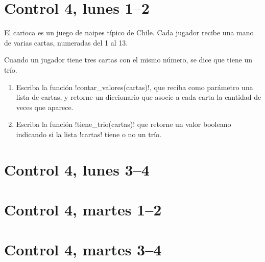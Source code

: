 \documentclass[12pt,spanish,a5paper,landscape]{article}
\begin{document}
  \pagestyle{empty}
  \thispagestyle{empty}

  \part*{Control 4, lunes 1--2}
  \newpage

  El carioca es un juego de naipes típico de Chile.
  Cada jugador recibe una mano de varias cartas,
  numeradas del 1 al 13.

  Cuando un jugador tiene tres cartas con el mismo número,
  se dice que tiene un trío.

  \begin{enumerate}
    \item
      Escriba la función \li!contar_valores(cartas)!,
      que reciba como parámetro una lista de cartas,
      y retorne un diccionario que asocie a cada carta
      la cantidad de veces que aparece.
      

    \item
      Escriba la función \li!tiene_trio(cartas)!
      que retorne un valor booleano
      indicando si la lista \li!cartas! tiene o no un trío.
      

  \end{enumerate}
  \newpage

  \part*{Control 4, lunes 3--4}
  \newpage

  \newpage

  \part*{Control 4, martes 1--2}
  \newpage

  \newpage

  \part*{Control 4, martes 3--4}
  \newpage
\end{document}
